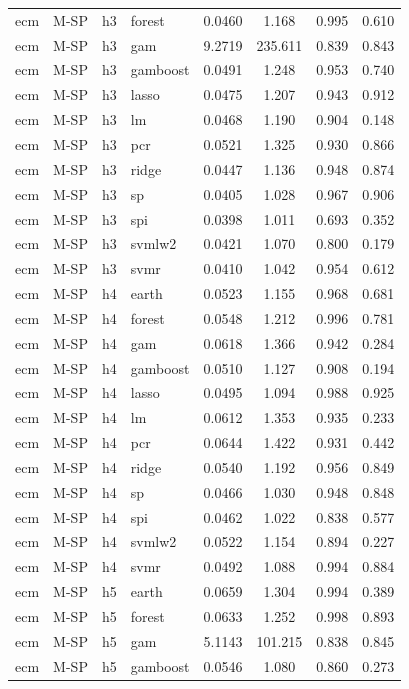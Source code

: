 \begin{ThreePartTable}
\begin{longtable}[t]{llclcccc}
ecm & M-SP & h3 & forest & 0.0460 & 1.168 & 0.995 & 0.610\\
ecm & M-SP & h3 & gam & 9.2719 & 235.611 & 0.839 & 0.843\\
ecm & M-SP & h3 & gamboost & 0.0491 & 1.248 & 0.953 & 0.740\\
ecm & M-SP & h3 & lasso & 0.0475 & 1.207 & 0.943 & 0.912\\
ecm & M-SP & h3 & lm & 0.0468 & 1.190 & 0.904 & 0.148\\
ecm & M-SP & h3 & pcr & 0.0521 & 1.325 & 0.930 & 0.866\\
ecm & M-SP & h3 & ridge & 0.0447 & 1.136 & 0.948 & 0.874\\
ecm & M-SP & h3 & sp & 0.0405 & 1.028 & 0.967 & 0.906\\
ecm & M-SP & h3 & spi & 0.0398 & 1.011 & 0.693 & 0.352\\
ecm & M-SP & h3 & svmlw2 & 0.0421 & 1.070 & 0.800 & 0.179\\
ecm & M-SP & h3 & svmr & 0.0410 & 1.042 & 0.954 & 0.612\\
\addlinespace
ecm & M-SP & h4 & earth & 0.0523 & 1.155 & 0.968 & 0.681\\
ecm & M-SP & h4 & forest & 0.0548 & 1.212 & 0.996 & 0.781\\
ecm & M-SP & h4 & gam & 0.0618 & 1.366 & 0.942 & 0.284\\
ecm & M-SP & h4 & gamboost & 0.0510 & 1.127 & 0.908 & 0.194\\
ecm & M-SP & h4 & lasso & 0.0495 & 1.094 & 0.988 & 0.925\\
ecm & M-SP & h4 & lm & 0.0612 & 1.353 & 0.935 & 0.233\\
ecm & M-SP & h4 & pcr & 0.0644 & 1.422 & 0.931 & 0.442\\
ecm & M-SP & h4 & ridge & 0.0540 & 1.192 & 0.956 & 0.849\\
ecm & M-SP & h4 & sp & 0.0466 & 1.030 & 0.948 & 0.848\\
ecm & M-SP & h4 & spi & 0.0462 & 1.022 & 0.838 & 0.577\\
ecm & M-SP & h4 & svmlw2 & 0.0522 & 1.154 & 0.894 & 0.227\\
ecm & M-SP & h4 & svmr & 0.0492 & 1.088 & 0.994 & 0.884\\
\addlinespace
ecm & M-SP & h5 & earth & 0.0659 & 1.304 & 0.994 & 0.389\\
ecm & M-SP & h5 & forest & 0.0633 & 1.252 & 0.998 & 0.893\\
ecm & M-SP & h5 & gam & 5.1143 & 101.215 & 0.838 & 0.845\\
ecm & M-SP & h5 & gamboost & 0.0546 & 1.080 & 0.860 & 0.273\\

\end{longtable}
\end{ThreePartTable}
